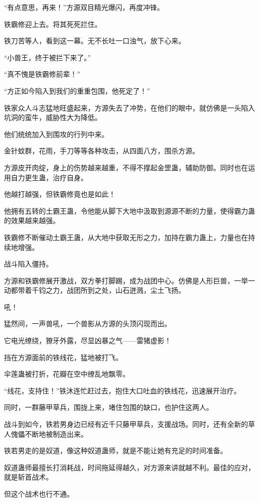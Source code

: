 \begin{this_body}
“有点意思，再来！”方源双目精光爆闪，再度冲锋。

铁霸修迎上去。将其死死拦住。

铁刀苦等人，看到这一幕。无不长吐一口浊气，放下心来。

“小兽王，终于被拦下来了。”

“真不愧是铁霸修前辈！”

“方正如今陷入到我们的重重包围，他死定了！”

铁家众人斗志猛地旺盛起来，方源失去了冲势，在他们的眼中，就仿佛是一头陷入坑洞的蛮牛，威胁性大为降低。

他们统统加入到围攻的行列中来。

金针蚊群，花雨，手刀等等各种攻击，从四面八方，围杀方源。

方源皮开肉绽，身上的伤势越来越重，不得不撑起金罡蛊，辅助防御。同时也在运用自力更生蛊，治疗自身。

他越打越强，但铁霸修竟也是如此！

他拥有五转的土霸王蛊，令他能从脚下大地中汲取到源源不断的力量，使得霸力蛊的效果越来越强。

铁霸修不断催动土霸王蛊，从大地中获取无形之力，加持在霸力蛊上，力量也在持续地增强。

战斗陷入僵持。

方源和铁霸修展开激战，双方拳打脚踢，成为战团中心。仿佛是人形巨兽，一举一动都带着千钧之力，战团所到之处，山石迸溅，尘土飞扬。

吼！

猛然间，一声兽吼，一个兽影从方源的头顶闪现而出。

它电光缭绕，獠牙外露，尽显凶暴之气——雷猪虚影！

挡在方源面前的铁线花，猛地被打飞。

伞莲蛊被打折，花瓣在空中缭乱地飘零。

“线花，支持住！”铁沐连忙赶过去，抱住大口吐血的铁线花，迅速展开治疗。

同时，一群藤甲草兵，围拢上来，堵住包围的缺口，也护住这两人。

战斗到如今，铁若男身边已经有近千只藤甲草兵，支援战场。同时，还有全新的草人傀儡不断地被制造出来。

铁若男走的是奴道，像这种奴道蛊师，就是不能让她有充足的时间准备。

奴道蛊师最擅长打消耗战，时间拖延得越久，对方源来讲就越不利。最佳的应对，就是斩首战术。

但这个战术也行不通。


\end{this_body}
